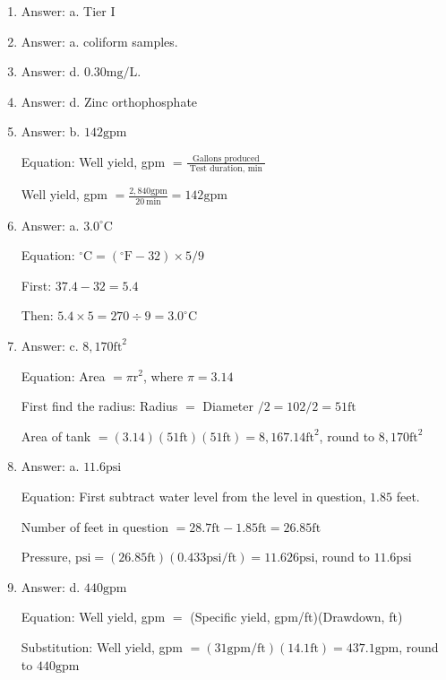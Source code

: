 \documentclass[10pt]{article}
\begin{document}
\begin{enumerate}
  \item Answer: a. Tier I

  \item Answer: a. coliform samples.

  \item Answer: d. $0.30 \mathrm{mg} / \mathrm{L}$.

  \item Answer: d. Zinc orthophosphate
  
  \item Answer: b. $142 \mathrm{gpm}$

Equation: Well yield, gpm $=\frac{\text { Gallons produced }}{\text { Test duration, min }}$

Well yield, gpm $=\frac{2,840 \mathrm{gpm}}{20 \mathrm{~min}}=142 \mathrm{gpm}$

  \item Answer: a. $3.0^{\circ} \mathrm{C}$

Equation: ${ }^{\circ} \mathrm{C}=\left({ }^{\circ} \mathrm{F}-32\right) \times 5 / 9$

First: $37.4-32=5.4$

Then: $5.4 \times 5=270 \div 9=3.0^{\circ} \mathrm{C}$

  \item Answer: c. $8,170 \mathrm{ft}^{2}$

Equation: Area $=\pi \mathrm{r}^{2}$, where $\pi=3.14$

First find the radius: Radius $=$ Diameter $/ 2=102 / 2=51 \mathrm{ft}$

Area of tank $=(3.14)(51 \mathrm{ft})(51 \mathrm{ft})=8,167.14 \mathrm{ft}^{2}$, round to $8,170 \mathrm{ft}^{2}$

  \item Answer: a. $11.6 \mathrm{psi}$

Equation: First subtract water level from the level in question, $1.85$ feet.

Number of feet in question $=28.7 \mathrm{ft}-1.85 \mathrm{ft}=26.85 \mathrm{ft}$

Pressure, $\mathrm{psi}=(26.85 \mathrm{ft})(0.433 \mathrm{psi} / \mathrm{ft})=11.626 \mathrm{psi}$, round to $11.6 \mathrm{psi}$

  \item Answer: d. $440 \mathrm{gpm}$

Equation: Well yield, gpm $=$ (Specific yield, gpm/ft)(Drawdown, ft)

Substitution: Well yield, gpm $=(31 \mathrm{gpm} / \mathrm{ft})(14.1 \mathrm{ft})=437.1 \mathrm{gpm}$, round to $440 \mathrm{gpm}$


\end{enumerate}
\end{document}
